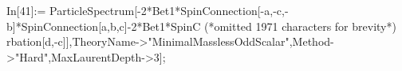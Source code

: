 In[41]:= ParticleSpectrum[-2*Bet1*SpinConnection[-a,-c,-b]*SpinConnection[a,b,c]-2*Bet1*SpinC (*omitted 1971 characters for brevity*) rbation[d,-c]],TheoryName->"MinimalMasslessOddScalar",Method->"Hard",MaxLaurentDepth->3];